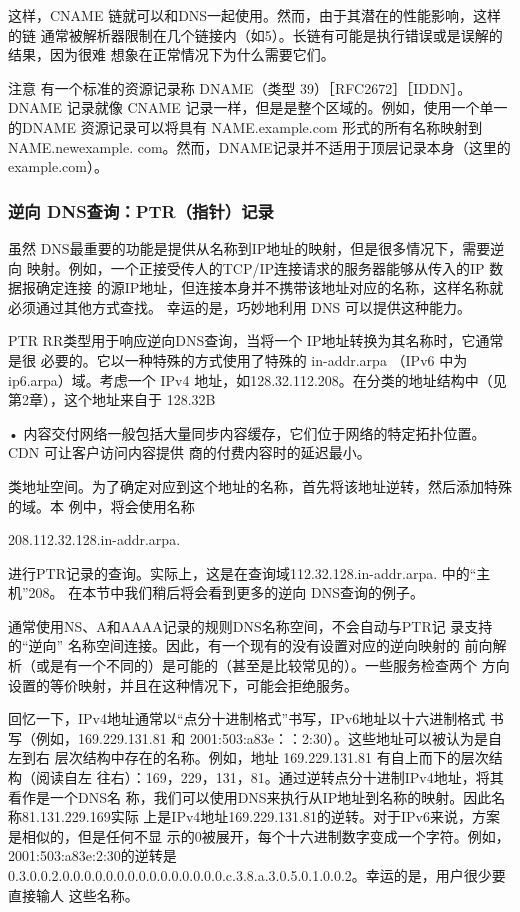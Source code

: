 这样，CNAME 链就可以和DNS一起使用。然而，由于其潜在的性能影响，这样的链
通常被解析器限制在几个链接内（如5）。长链有可能是执行错误或是误解的结果，因为很难
想象在正常情况下为什么需要它们。

注意 有一个标准的资源记录称 DNAME（类型 39）［RFC2672］［IDDN］。 DNAME
记录就像 CNAME 记录一样，但是是整个区域的。例如，使用一个单一的DNAME
资源记录可以将具有 NAME.example.com 形式的所有名称映射到 NAME.newexample.
com。然而，DNAME记录并不适用于顶层记录本身（这里的 example.com）。

\subsubsection{逆向 DNS查询：PTR（指针）记录}

虽然 DNS最重要的功能是提供从名称到IP地址的映射，但是很多情况下，需要逆向
映射。例如，一个正接受传人的TCP/IP连接请求的服务器能够从传入的IP 数据报确定连接
的源IP地址，但连接本身并不携带该地址对应的名称，这样名称就必须通过其他方式查找。
幸运的是，巧妙地利用 DNS 可以提供这种能力。

PTR RR类型用于响应逆向DNS查询，当将一个 IP地址转换为其名称时，它通常是很
必要的。它以一种特殊的方式使用了特殊的 in-addr.arpa （IPv6 中为 ip6.arpa）域。考虑一个
IPv4 地址，如128.32.112.208。在分类的地址结构中（见第2章），这个地址来自于 128.32B

• 内容交付网络一般包括大量同步内容缓存，它们位于网络的特定拓扑位置。CDN 可让客户访问内容提供
商的付费内容时的延迟最小。

类地址空间。为了确定对应到这个地址的名称，首先将该地址逆转，然后添加特殊的域。本
例中，将会使用名称

208.112.32.128.in-addr.arpa.

进行PTR记录的查询。实际上，这是在查询域112.32.128.in-addr.arpa. 中的“主机”208。
在本节中我们稍后将会看到更多的逆向 DNS查询的例子。

\begin{tcolorbox}
    通常使用NS、A和AAAA记录的规则DNS名称空间，不会自动与PTR记
    录支持的“逆向” 名称空间连接。因此，有一个现有的没有设置对应的逆向映射的
    前向解析（或是有一个不同的）是可能的（甚至是比较常见的）。一些服务检查两个
    方向设置的等价映射，并且在这种情况下，可能会拒绝服务。
\end{tcolorbox}

回忆一下，IPv4地址通常以“点分十进制格式”书写，IPv6地址以十六进制格式
书写（例如，169.229.131.81 和 2001:503:a83e：：2:30）。这些地址可以被认为是自左到右
层次结构中存在的名称。例如，地址 169.229.131.81 有自上而下的层次结构（阅读自左
往右）：169，229，131，81。通过逆转点分十进制IPv4地址，将其看作是一个DNS名
称，我们可以使用DNS来执行从IP地址到名称的映射。因此名称81.131.229.169实际
上是IPv4地址169.229.131.81的逆转。对于IPv6来说，方案是相似的，但是任何不显
示的0被展开，每个十六进制数字变成一个字符。例如，2001:503:a83e:2:30的逆转是
0.3.0.0.2.0.0.0.0.0.0.0.0.0.0.0.0.0.0.0.c.3.8.a.3.0.5.0.1.0.0.2。幸运的是，用户很少要直接输人
这些名称。

